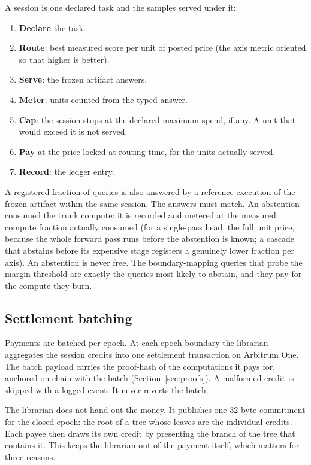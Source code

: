 \documentclass[11pt]{article}
\begin{document}
A session is one declared task and the samples served under it:
\begin{enumerate}
    \item \textbf{Declare} the task.
    \item \textbf{Route}: best measured score per unit of posted
          price (the axis metric oriented so that higher is better).
    \item \textbf{Serve}: the frozen artifact answers.
    \item \textbf{Meter}: units counted from the typed answer.
    \item \textbf{Cap}: the session stops at the declared maximum
          spend, if any. A unit that would exceed it is not served.
    \item \textbf{Pay} at the price locked at routing time, for the
          units actually served.
    \item \textbf{Record}: the ledger entry.
\end{enumerate}
A registered fraction of queries is also answered by a reference
execution of the frozen artifact within the same session. The
answers must match. An abstention consumed the trunk compute: it
is recorded and metered at the measured compute fraction actually
consumed (for a single-pass head, the full unit price, because
the whole forward pass runs before the abstention is known; a
cascade that abstains before its expensive stage registers a
genuinely lower fraction per axis). An abstention is never free. The
boundary-mapping queries that
probe the margin threshold are exactly the queries most likely
to abstain, and they pay for the compute they burn.

\subsection{Settlement batching}

Payments are batched per epoch. At each epoch boundary the
librarian aggregates the session credits into one settlement
transaction on Arbitrum One. The batch payload carries the
proof-hash of the computations it pays for, anchored on-chain
with the batch (Section~\ref{sec:proofs}). A malformed credit is
skipped with a logged event. It never reverts the batch.

The librarian does not hand out the money. It publishes one
32-byte commitment for the closed epoch: the root of a tree whose
leaves are the individual credits. Each payee then draws its own
credit by presenting the branch of the tree that contains it.
This keeps the librarian out of the payment itself, which matters
for three reasons.
\end{document}
